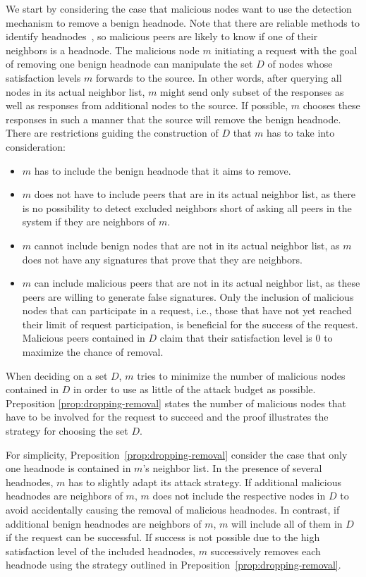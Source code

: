 We start by considering the case that malicious nodes want to use the detection mechanism to remove a benign headnode. 
Note that there are reliable methods to identify headnodes~\cite{nguyen2016swap}, so malicious peers are likely to know if one of their neighbors is a headnode.  
The malicious node $m$ initiating a request with the goal of removing one benign headnode can manipulate the set $D$ of nodes whose satisfaction levels $m$ forwards to the source. 
In other words, after querying all nodes in its actual neighbor list, $m$ might send only  subset of the responses as well as responses from additional nodes to the source. If possible, $m$ chooses these responses in such a manner that the source will remove the benign headnode. 
There are restrictions guiding the construction of $D$ that $m$ has to take into consideration:
\begin{itemize}
\item $m$ has to include the benign headnode that it aims to remove. 
\item $m$ does not have to include peers that are in its actual neighbor list, as there is no possibility to detect excluded neighbors short of asking all peers in the system if they are neighbors of $m$. 
\item $m$ cannot include benign nodes that are not in its actual neighbor list, as $m$ does not have any signatures that prove that they are neighbors.
\item $m$ can include malicious peers that are not in its actual neighbor list, as these peers are willing to generate false signatures. Only the inclusion of malicious nodes that can participate in a \drop request, i.e., those that have not yet reached their limit of \drop request participation, is beneficial for the success of the request. Malicious peers contained in $D$ claim that their satisfaction level is 0 to maximize the chance of removal. 
\end{itemize}

When deciding on a set $D$, $m$ tries to minimize the number of malicious nodes contained in $D$ in order to use as little of the attack budget as possible. 
Preposition \ref{prop:dropping-removal} states the number of malicious nodes that have to be involved for the request to succeed and the proof illustrates the strategy for choosing the set $D$. 

For simplicity, Preposition~\ref{prop:dropping-removal} consider the case that only one headnode is contained in $m$'s neighbor list. In the presence of several headnodes, $m$ has to slightly adapt its attack strategy. 
If additional malicious headnodes are neighbors of $m$, $m$ does not include the respective nodes in $D$ to avoid accidentally causing the removal of malicious headnodes.  In contrast, if additional benign headnodes are neighbors of $m$, $m$ will include all of them in $D$ if the \drop request can be successful. If success is not possible due to the high satisfaction level of the included headnodes, $m$ successively removes each headnode using the strategy outlined in Preposition~\ref{prop:dropping-removal}.   
 

